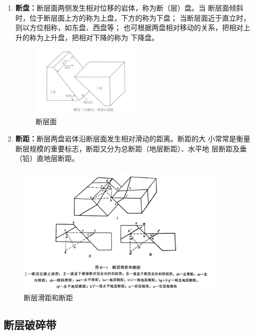 \documentclass[a4paper,twoside]{ctexart}
\begin{document}
\begin{enumerate}
\item \textbf{断盘：}断层面两侧发生相对位移的岩体，称为断（层）盘。当
  断层面倾斜时，位于断层面上方的称为上盘，下方的称为下盘；
  当断层面近于直立时，则以方位相称，如东盘、西盘等；
  也可根据两盘相对移动的关系，把相对上升的称为上升盘，把相对下降的称为
  下降盘。

  \begin{figure}[htbp]
  \centering
    \includegraphics[width=0.5\textwidth]{pic/断层面.png}
  \caption{断层面}
  \label{fig:断层面}
\end{figure}

\item \textbf{断距：}断层两盘岩体沿断层面发生相对滑动的距离。断距的大
  小常常是衡量断层规模的重要标志，断距又分为总断距（地层断距）、水平地
  层断距及垂（铅）直地层断距。

\end{enumerate}
\begin{figure}[htbp]
  \centering
    \includegraphics[width=0.9\textwidth]{pic/断层滑距和断距.png}
  \caption{断层滑距和断距}
  \label{fig:断层滑距和断距}
\end{figure}

\subsection{断层破碎带}
\end{document}

